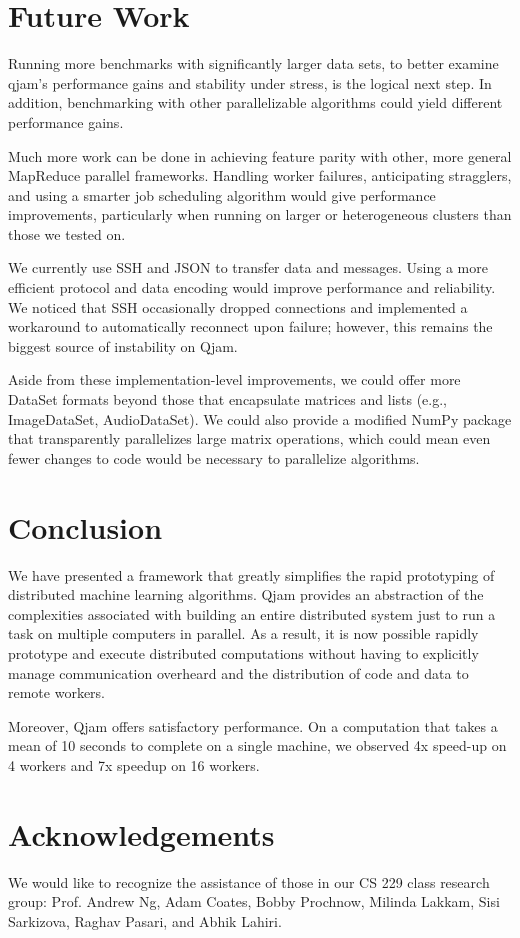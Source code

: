 \documentclass[%
  final,
  notitlepage,
  narroweqnarray,
  inline,
]{ieee}
\begin{document}
\section{Future Work}

Running more benchmarks with significantly larger data sets, to better examine
qjam's performance gains and stability under stress, is the logical next step.
In addition, benchmarking with other parallelizable algorithms could yield
different performance gains.

Much more work can be done in achieving feature parity with other, more general
MapReduce parallel frameworks. Handling worker failures, anticipating
stragglers, and using a smarter job scheduling algorithm would give performance
improvements, particularly when running on larger or heterogeneous clusters
than those we tested on.

We currently use SSH and JSON to transfer data and messages. Using a more
efficient protocol and data encoding would improve performance and
reliability. We noticed that SSH occasionally dropped connections and
implemented a workaround to automatically reconnect upon failure; however, this
remains the biggest source of instability on Qjam.

Aside from these implementation-level improvements, we could offer more DataSet
formats beyond those that encapsulate matrices and lists (e.g., ImageDataSet,
AudioDataSet). We could also provide a modified NumPy package that
transparently parallelizes large matrix operations, which could mean even fewer
changes to code would be necessary to parallelize algorithms.

\section{Conclusion}
We have presented a framework that greatly simplifies the rapid prototyping of
distributed machine learning algorithms. Qjam provides an abstraction of the
complexities associated with building an entire distributed system just to run a
task on multiple computers in parallel. As a result, it is now possible rapidly
prototype and execute distributed computations without having to explicitly
manage communication overheard and the distribution of code and data to
remote workers.

Moreover, Qjam offers satisfactory performance. On a computation that takes a
mean of 10 seconds to complete on a single machine, we observed 4x speed-up on 4
workers and 7x speedup on 16 workers.

\section{Acknowledgements}
We would like to recognize the assistance of those in our CS 229 class research
group: Prof. Andrew Ng, Adam Coates, Bobby Prochnow, Milinda Lakkam, Sisi
Sarkizova, Raghav Pasari, and Abhik Lahiri.




\end{document}
